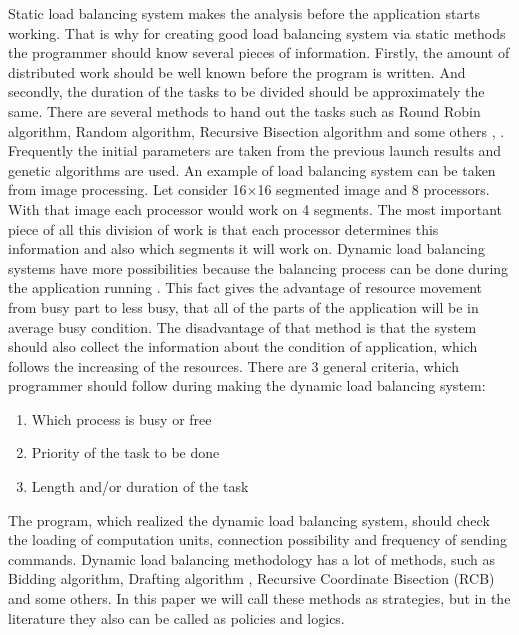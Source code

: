 Static load balancing system makes the analysis before the application starts working. That is why for creating good load balancing system via static methods the programmer should know several pieces of information. Firstly, the amount of distributed work should be well known before the program is written. And secondly, the duration of the tasks to be divided should be approximately the same. There are several methods to hand out the tasks such as Round Robin algorithm, Random algorithm, Recursive Bisection algorithm and some others \cite{oper_sys_conc}, \cite{perf_dlba}. Frequently the initial parameters are taken from the previous launch results and genetic algorithms are used. An example of load balancing system can be taken from image processing. Let consider 16$\times$16 segmented image and 8 processors. With that image each processor would work on 4 segments. The most important piece of all this division of work is that each processor determines this information and also which segments it will work on.
\newpage
Dynamic load balancing systems have more possibilities because the balancing process can be done during the application running \cite{guide_dyn_bal}. This fact gives the advantage of resource movement from busy part to less busy, that all of the parts of the application will be in average busy condition. The disadvantage of that method is that the system should also collect the information about the condition of application, which follows the increasing of the resources. There are 3 general criteria, which programmer should follow during making the dynamic load balancing system:
\begin{enumerate}%
	\setlength{\itemsep}{-2mm}
	\item Which process is busy or free 
	\item Priority of the task to be done 
	\item Length and/or duration of the task
\end{enumerate}
The program, which realized the dynamic load balancing system, should check the loading of computation units, connection possibility and frequency of sending commands. Dynamic load balancing methodology has a lot of methods, such as Bidding algorithm, Drafting algorithm \cite{draft_alg}, Recursive Coordinate Bisection (RCB) and some others. In this paper we will call these methods as strategies, but in the literature they also can be called as policies and logics.

\newpage
